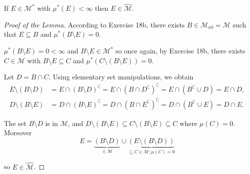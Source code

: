 \begin{lemma}\label{lemma:sets-of-finite-outer-measures}
    If \( E \in \mathcal{M}^{\ast} \) with \( \mu^{\ast}(E) < \infty \) then \( E \in \widehat{\mathcal{M}} \).
\end{lemma}

\begin{proof}[Proof of the Lemma]
    According to Exercise 18b, there exists \( B \in \mathcal{M}_{\sigma\delta} = \mathcal{M} \) such that \( E \subseteq B \) and \( \mu^{\ast}(B \setminus E) = 0 \).

    \( \mu^{\ast}(B \setminus E) = 0 < \infty \) and \( B \setminus E \in \mathcal{M}^{\ast} \) so once again, by Exercise 18b, there exists \( C \in \mathcal{M} \) with \( B \setminus E \subseteq C \) and \( \mu^{\ast}(C \setminus (B \setminus E)) = 0 \).

    Let \( D = B \cap C \). Using elementary set manipulations, we obtain
    \begingroup
    \allowdisplaybreaks
    \begin{align*}
        E \setminus (B \setminus D) & = E \cap {(B \setminus D)}^{\complement} = E \cap {(B \cap D^{\complement})}^{\complement} = E \cap (B^{\complement} \cup D) = E \cap D, \\
        D \setminus (B \setminus E) & = D \cap {(B \setminus E)}^{\complement} = D \cap {(B \cap E^{\complement})}^{\complement} = D \cap (B^{\complement} \cup E) = D \cap E.
    \end{align*}
    \endgroup

    The set \( B \setminus D \) is in \( \mathcal{M} \), and \( D \setminus (B \setminus E) \subseteq C \setminus (B \setminus E) \subseteq C \) where \( \mu(C) = 0 \). Moreover
    \[
        E = \underbrace{(B \setminus D)}_{\in \mathcal{M}} \cup \underbrace{(E \setminus (B \setminus D))}_{\subseteq C \in \mathcal{M}; \mu(C) = 0}
    \]

    so \( E \in \widehat{\mathcal{M}} \).
\end{proof}

